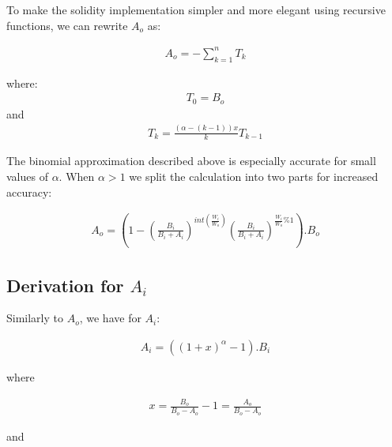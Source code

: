 \documentclass[11pt]{amsart}
\begin{document}
To make the solidity implementation simpler and more elegant using recursive functions, we can rewrite $A_o$ as:

\begin{equation}
\begin{gathered}
A_o = -\sum_{k=1}^{n}T_k
\end{gathered}
\end{equation}


where:
\begin{equation}
\begin{gathered}
T_0 = B_o
\end{gathered}
\end{equation}
and
\begin{equation}
\begin{gathered}
T_k = \frac{\left(\alpha-(k-1)\right)x}{k} T_{k-1}
\end{gathered}
\end{equation}

The binomial approximation described above is especially accurate for small values of $\alpha$. When $\alpha>1$ we split the calculation into two parts for increased accuracy:

\begin{equation}
\begin{gathered}
A_o = \left(1 - \left(\frac{B_i}{B_i+A_i}\right)^{int\left(\frac{W_i}{W_o}\right)}\left(\frac{B_i}{B_i+A_i}\right)^{\frac{W_i}{W_o}\%1}\right).B_o
\end{gathered}
\end{equation}

\subsection{Derivation for $A_i$}
Similarly to $A_o$, we have for $A_i$:

\begin{equation}
\begin{gathered}
A_i = \left(\left(1+x\right)^{\alpha}-1\right).B_i
\end{gathered}
\end{equation}

where

\begin{equation}
\begin{gathered}
x = \frac{B_o}{B_o-A_o} - 1 = \frac{A_o}{B_o-A_o}
\end{gathered}
\end{equation}

and
\end{document}
